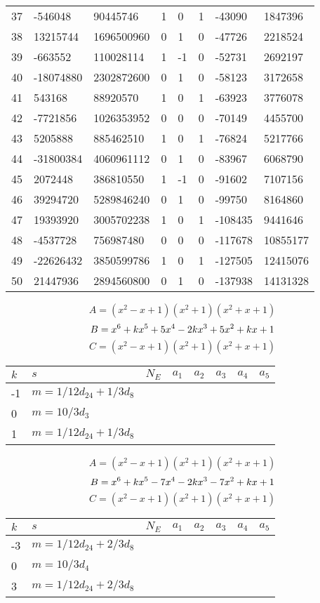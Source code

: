 \documentclass{amsart}
\begin{document}
\begin{longtable}{|l|l|l|lllll|}
37&-546048&90445746&1&0&1&-43090&1847396\\
38&13215744&1696500960&0&1&0&-47726&2218524\\
39&-663552&110028114&1&-1&0&-52731&2692197\\
40&-18074880&2302872600&0&1&0&-58123&3172658\\
41&543168&88920570&1&0&1&-63923&3776078\\
42&-7721856&1026353952&0&0&0&-70149&4455700\\
43&5205888&885462510&1&0&1&-76824&5217766\\
44&-31800384&4060961112&0&1&0&-83967&6068790\\
45&2072448&386810550&1&-1&0&-91602&7107156\\
46&39294720&5289846240&0&1&0&-99750&8164860\\
47&19393920&3005702238&1&0&1&-108435&9441646\\
48&-4537728&756987480&0&0&0&-117678&10855177\\
49&-22626432&3850599786&1&0&1&-127505&12415076\\
50&21447936&2894560800&0&1&0&-137938&14131328\\
\hline
\end{longtable}
$$A=(x^2
 - x
 + 1)(x^2
 + 1)(x^2
 + x
 + 1)$$
$$B=x^6
 + k\*x^5
 + 5\*x^4
 - 2\*k\*x^3
 + 5\*x^2
 + k\*x
 + 1$$
$$C=(x^2
 - x
 + 1)(x^2
 + 1)(x^2
 + x
 + 1)$$
\begin{longtable}{|l|l|l|lllll|}
\hline
$k$ & $s$ & $N_E$ & $a_1$ & $a_2$ & $a_3$ & $a_4$ & $a_5$\\
\hline
-1&$m=1/12d_{24}+1/3d_{8}$&&\multicolumn{5}{c|}{}\\
0&$m=10/3d_{3}$&&\multicolumn{5}{c|}{}\\
1&$m=1/12d_{24}+1/3d_{8}$&&\multicolumn{5}{c|}{}\\
\hline
\end{longtable}
$$A=(x^2
 - x
 + 1)(x^2
 + 1)(x^2
 + x
 + 1)$$
$$B=x^6
 + k\*x^5
 - 7\*x^4
 - 2\*k\*x^3
 - 7\*x^2
 + k\*x
 + 1$$
$$C=(x^2
 - x
 + 1)(x^2
 + 1)(x^2
 + x
 + 1)$$
\begin{longtable}{|l|l|l|lllll|}
\hline
$k$ & $s$ & $N_E$ & $a_1$ & $a_2$ & $a_3$ & $a_4$ & $a_5$\\
\hline
-3&$m=1/12d_{24}+2/3d_{8}$&&\multicolumn{5}{c|}{}\\
0&$m=10/3d_{4}$&&\multicolumn{5}{c|}{}\\
3&$m=1/12d_{24}+2/3d_{8}$&&\multicolumn{5}{c|}{}\\
\hline
\end{longtable}
\end{document}
